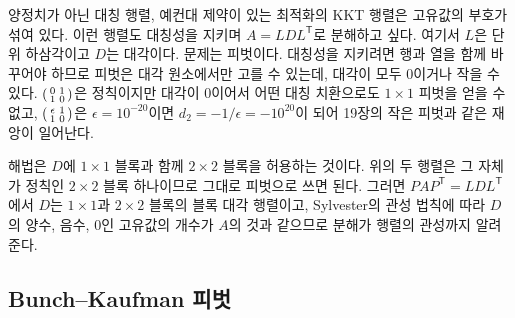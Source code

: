 양정치가 아닌 대칭 행렬, 예컨대 제약이 있는 최적화의 KKT 행렬은 고유값의 부호가 섞여 있다. 이런 행렬도 대칭성을 지키며 $A=LDL^{\mathsf T}$로 분해하고 싶다. 여기서 $L$은 단위 하삼각이고 $D$는 대각이다. 문제는 피벗이다. 대칭성을 지키려면 행과 열을 함께 바꾸어야 하므로 피벗은 대각 원소에서만 고를 수 있는데, 대각이 모두 $0$이거나 작을 수 있다. $\begin{psmallmatrix}0&1\\1&0\end{psmallmatrix}$은 정칙이지만 대각이 $0$이어서 어떤 대칭 치환으로도 $1\times1$ 피벗을 얻을 수 없고, $\begin{psmallmatrix}\epsilon&1\\1&0\end{psmallmatrix}$은 $\epsilon=10^{-20}$이면 $d_2=-1/\epsilon=-10^{20}$이 되어 19장의 작은 피벗과 같은 재앙이 일어난다.

해법은 $D$에 $1\times1$ 블록과 함께 $2\times2$ 블록을 허용하는 것이다\cite{bunch1971parlett}. 위의 두 행렬은 그 자체가 정칙인 $2\times2$ 블록 하나이므로 그대로 피벗으로 쓰면 된다. 그러면 $PAP^{\mathsf T}=LDL^{\mathsf T}$에서 $D$는 $1\times1$과 $2\times2$ 블록의 블록 대각 행렬이고, Sylvester의 관성 법칙에 따라 $D$의 양수, 음수, $0$인 고유값의 개수가 $A$의 것과 같으므로 분해가 행렬의 관성까지 알려 준다.

\subsection{Bunch--Kaufman 피벗}

